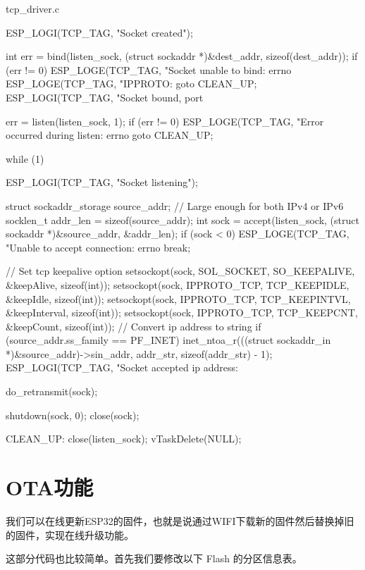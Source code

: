 \documentclass[lang=cn,newtx,10pt,scheme=chinese]{elegantbook}
\begin{document}
\begin{mycode}{tcp\_driver.c}
{    ESP_LOGI(TCP_TAG, "Socket created");

    int err = bind(listen_sock, (struct sockaddr *)&dest_addr, sizeof(dest_addr));
    if (err != 0)
    {
        ESP_LOGE(TCP_TAG, "Socket unable to bind: errno %
        ESP_LOGE(TCP_TAG, "IPPROTO: %
        goto CLEAN_UP;
    }
    ESP_LOGI(TCP_TAG, "Socket bound, port %

    err = listen(listen_sock, 1);
    if (err != 0)
    {
        ESP_LOGE(TCP_TAG, "Error occurred during listen: errno %
        goto CLEAN_UP;
    }

    while (1)
    {

        ESP_LOGI(TCP_TAG, "Socket listening");

        struct sockaddr_storage source_addr; // Large enough for both IPv4 or IPv6
        socklen_t addr_len = sizeof(source_addr);
        int sock = accept(listen_sock, (struct sockaddr *)&source_addr, &addr_len);
        if (sock < 0)
        {
            ESP_LOGE(TCP_TAG, "Unable to accept connection: errno %
            break;
        }

        // Set tcp keepalive option
        setsockopt(sock, SOL_SOCKET, SO_KEEPALIVE, &keepAlive, sizeof(int));
        setsockopt(sock, IPPROTO_TCP, TCP_KEEPIDLE, &keepIdle, sizeof(int));
        setsockopt(sock, IPPROTO_TCP, TCP_KEEPINTVL, &keepInterval, sizeof(int));
        setsockopt(sock, IPPROTO_TCP, TCP_KEEPCNT, &keepCount, sizeof(int));
        // Convert ip address to string
        if (source_addr.ss_family == PF_INET)
        {
            inet_ntoa_r(((struct sockaddr_in *)&source_addr)->sin_addr, addr_str, sizeof(addr_str) - 1);
        }
        ESP_LOGI(TCP_TAG, "Socket accepted ip address: %

        do_retransmit(sock);

        shutdown(sock, 0);
        close(sock);
    }

CLEAN_UP:
    close(listen_sock);
    vTaskDelete(NULL);
}
\end{mycode}

\chapter{OTA功能}

我们可以在线更新ESP32的固件，也就是说通过WIFI下载新的固件然后替换掉旧的固件，实现在线升级功能。

这部分代码也比较简单。首先我们要修改以下 Flash 的分区信息表。
\end{document}
